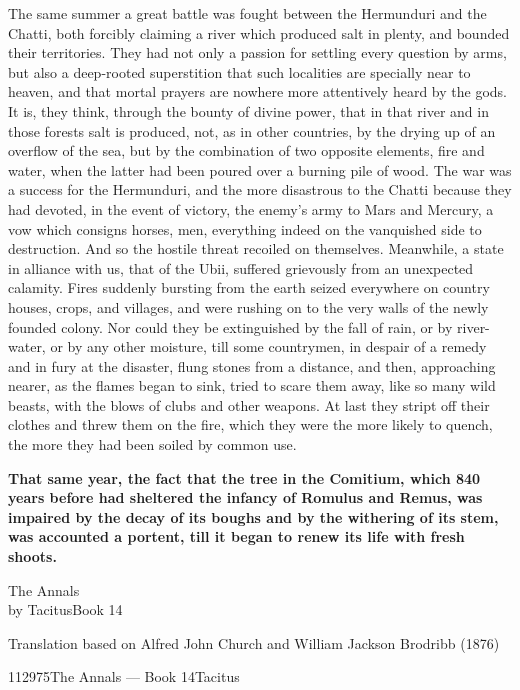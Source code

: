 
The same summer a great battle was fought between the Hermunduri and the Chatti, both forcibly claiming a river which produced salt in plenty, and bounded their territories. They had not only a passion for settling every question by arms, but also a deep-rooted superstition that such localities are specially near to heaven, and that mortal prayers are nowhere more attentively heard by the gods. It is, they think, through the bounty of divine power, that in that river and in those forests salt is produced, not, as in other countries, by the drying up of an overflow of the sea, but by the combination of two opposite elements, fire and water, when the latter had been poured over a burning pile of wood. The war was a success for the Hermunduri, and the more disastrous to the Chatti because they had devoted, in the event of victory, the enemy's army to Mars and Mercury, a vow which consigns horses, men, everything indeed on the vanquished side to destruction. And so the hostile threat recoiled on themselves. Meanwhile, a state in alliance with us, that of the Ubii, suffered grievously from an unexpected calamity. Fires suddenly bursting from the earth seized everywhere on country houses, crops, and villages, and were rushing on to the very walls of the newly founded colony. Nor could they be extinguished by the fall of rain, or by river-water, or by any other moisture, till some countrymen, in despair of a remedy and in fury at the disaster, flung stones from a distance, and then, approaching nearer, as the flames began to sink, tried to scare them away, like so many wild beasts, with the blows of clubs and other weapons. At last they stript off their clothes and threw them on the fire, which they were the more likely to quench, the more they had been soiled by common use.


\textbf{That same year, the fact that the tree in the Comitium, which 840 years before had sheltered the infancy of Romulus and Remus, was impaired by the decay of its boughs and by the withering of its stem, was accounted a portent, till it began to renew its life with fresh shoots.}


The Annals\\
by TacitusBook 14

Translation based on Alfred John Church and William Jackson Brodribb (1876)

112975The Annals — Book 14Tacitus

